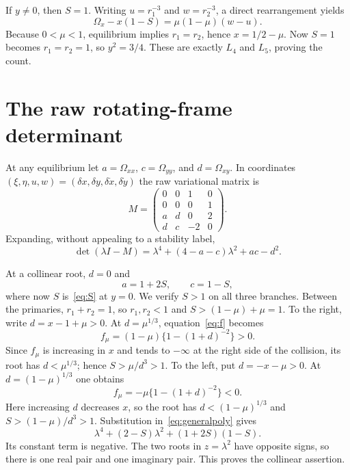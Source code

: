 \documentclass[10pt]{article}
\newcommand{\Om}{\Omega}
\begin{document}
If $y\ne0$, then $S=1$.  Writing $u=r_1^{-3}$ and $w=r_2^{-3}$, a direct
rearrangement yields
\begin{equation}\label{eq:offaxis}
 \Om_x-x(1-S)=\mu(1-\mu)(w-u).
\end{equation}
Because $0<\mu<1$, equilibrium implies $r_1=r_2$, hence
$x=1/2-\mu$.  Now $S=1$ becomes $r_1=r_2=1$, so $y^2=3/4$.  These are
exactly $L_4$ and $L_5$, proving the count.

\section{The raw rotating-frame determinant}
At any equilibrium let
$a=\Om_{xx}$, $c=\Om_{yy}$, and $d=\Om_{xy}$.  In coordinates
$(\xi,\eta,u,w)=(\delta x,\delta y,\delta\dot x,\delta\dot y)$ the raw
variational matrix is
\begin{equation}\label{eq:M}
 M=\begin{pmatrix}
 0&0&1&0\\0&0&0&1\\a&d&0&2\\d&c&-2&0
 \end{pmatrix}.
\end{equation}
Expanding, without appealing to a stability label,
\begin{equation}\label{eq:generalpoly}
 \det(\lambda I-M)=
 \lambda^4+(4-a-c)\lambda^2+ac-d^2.
\end{equation}

At a collinear root, $d=0$ and
\begin{equation}\label{eq:colhess}
 a=1+2S,\qquad c=1-S,
\end{equation}
where now $S$ is~\eqref{eq:S} at $y=0$.  We verify $S>1$ on all three
branches.  Between the primaries, $r_1+r_2=1$, so $r_1,r_2<1$ and
$S>(1-\mu)+\mu=1$.  To the right, write $d=x-1+\mu>0$.  At
$d=\mu^{1/3}$, equation~\eqref{eq:f} becomes
\[
 f_\mu=(1-\mu)\{1-(1+d)^{-2}\}>0.
\]
Since $f_\mu$ is increasing in $x$ and tends to $-\infty$ at the right side
of the collision, its root has $d<\mu^{1/3}$; hence
$S>\mu/d^3>1$.  To the left, put $d=-x-\mu>0$.  At
$d=(1-\mu)^{1/3}$ one obtains
\[
 f_\mu=-\mu\{1-(1+d)^{-2}\}<0.
\]
Here increasing $d$ decreases $x$, so the root has
$d<(1-\mu)^{1/3}$ and $S>(1-\mu)/d^3>1$.
Substitution in~\eqref{eq:generalpoly} gives
\begin{equation}\label{eq:colpoly}
 \lambda^4+(2-S)\lambda^2+(1+2S)(1-S).
\end{equation}
Its constant term is negative.  The two roots in $z=\lambda^2$ have opposite
signs, so there is one real pair and one imaginary pair.  This proves the
collinear assertion.
\end{document}
